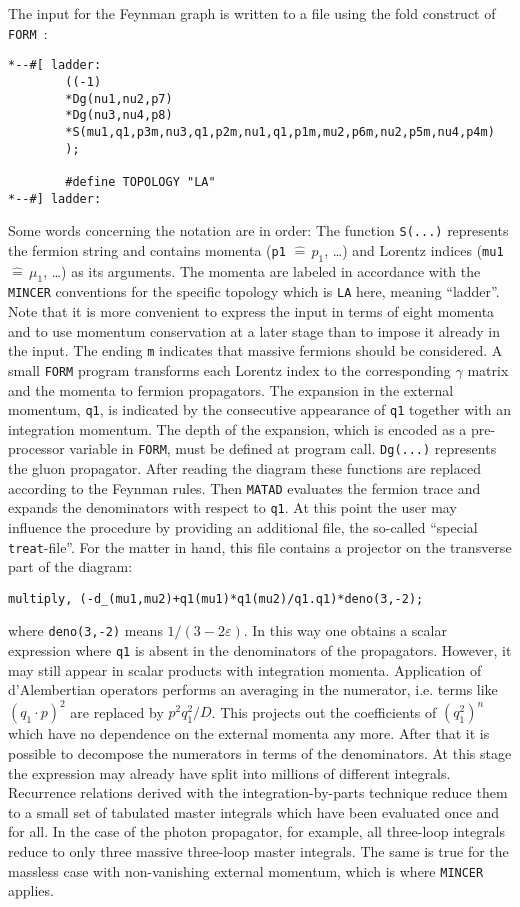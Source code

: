 The input for the Feynman graph is written to a file using the fold
construct of {\tt FORM}~\cite{form}:
\begin{verbatim}
*--#[ ladder:
        ((-1)
        *Dg(nu1,nu2,p7)
        *Dg(nu3,nu4,p8)
        *S(mu1,q1,p3m,nu3,q1,p2m,nu1,q1,p1m,mu2,p6m,nu2,p5m,nu4,p4m)
        );

        #define TOPOLOGY "LA"
*--#] ladder:
\end{verbatim}
Some words concerning the notation are in order: The function
\verb/S(...)/ represents the fermion string and contains momenta
(\verb/p1/ $\widehat = \,p_1$, \ldots) and Lorentz indices (\verb/mu1/
$\widehat = \,\mu_1$, \ldots) as its arguments. The momenta are labeled
in accordance with the {\tt MINCER} conventions for the specific
topology which is \verb/LA/ here, meaning ``ladder''. Note that it
is more convenient to express the input in terms of eight momenta and to
use momentum conservation at a later stage than to impose it already in
the input.  The ending \verb/m/ indicates that massive fermions should be
considered.  A small {\tt FORM} program transforms each Lorentz index to
the corresponding $\gamma$ matrix and the momenta to fermion
propagators.  The expansion in the external momentum, \verb/q1/, is
indicated by the consecutive appearance of \verb/q1/ together with an
integration momentum. The depth of the expansion, which is encoded
as a pre-processor variable in {\tt FORM}, must be defined at program
call. \verb/Dg(...)/ represents the gluon propagator.  After reading the
diagram these functions are replaced according to the Feynman rules.
Then {\tt MATAD} evaluates the fermion trace and expands the
denominators with respect to \verb/q1/.  At this point the user may
influence the procedure by providing an additional file, the so-called
``special {\tt treat}-file''. For the matter in hand, this file contains
a projector on the transverse part
of the diagram:
%
\begin{verbatim}
multiply, (-d_(mu1,mu2)+q1(mu1)*q1(mu2)/q1.q1)*deno(3,-2);
\end{verbatim}
%
where \verb/deno(3,-2)/ means $1/(3-2\varepsilon)$.  In this way one
obtains a scalar expression where \verb/q1/ is absent in the
denominators of the propagators. However, it may still appear in scalar
products with integration momenta.  Application of d'Alembertian
operators performs an averaging in the numerator, i.e. terms like
$(q_1\cdot p)^2$ are replaced by $p^2 q_1^2/D$. This projects out the
coefficients of $(q_1^2)^n$ which have no dependence on the external
momenta any more.  After that it is possible to decompose the numerators
in terms of the denominators.  At this stage the expression may already
have split into millions of different integrals.  Recurrence relations
derived with the integration-by-parts technique reduce them to a small
set of tabulated master integrals which have been evaluated once and for
all.  In the case of the photon propagator, for example, all three-loop
integrals reduce to only three massive three-loop master integrals.  The
same is true for the massless case with non-vanishing external momentum,
which is where {\tt MINCER} applies.

